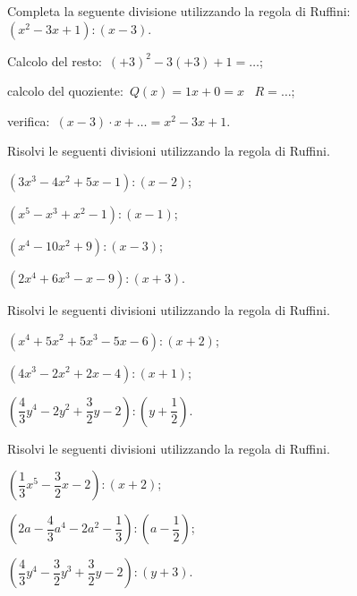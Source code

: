 \begin{esercizio}
\label{ese:11.31}
Completa la seguente divisione utilizzando la regola di Ruffini:\:$\left(x^{2}-3x+1\right):(x-3)$.
\begin{itemize*}
\item Calcolo del resto:~$(+3)^{2}-3(+3)+1=\ldots$;
\item calcolo del quoziente:~$Q(x)=1x+0=x$ \quad~$R=\ldots$;
\item verifica:~$(x-3)\cdot x+\ldots =x^{2}-3x+1$.
\end{itemize*}
\end{esercizio}

\begin{esercizio}[\Ast]
\label{ese:11.32}
Risolvi le seguenti divisioni utilizzando la regola di Ruffini.
\begin{multicols}{2}
 \begin{enumeratea}
 \item $\left(3x^{3}-4x^{2}+5x-1\right):(x-2)$;
 \item $\left(x^{5}-x^{3}+x^{2}-1\right):(x-1)$;
 \item $\left(x^{4}-10x^{2}+9\right):(x-3)$;
 \item $\left(2x^{4}+6x^{3}-x-9\right):(x+3)$.
 \end{enumeratea}
\end{multicols}
\end{esercizio}

\begin{esercizio}[\Ast]
\label{ese:11.33}
Risolvi le seguenti divisioni utilizzando la regola di Ruffini.
\begin{multicols}{2}
 \begin{enumeratea}
 \item $\left(x^{4}+5x^{2}+5x^{3}-5x-6 \right):(x+2)$;%
 \item $\left(4x^{3}-2x^{2}+2x-4 \right):(x+1)$;%
 \item $\left(\dfrac{4}{3}y^{4}-2y^{2}+\dfrac{3}{2}y-2\right):\left(y+\dfrac{1}{2}\right)$.%
 \end{enumeratea}
\end{multicols}
\end{esercizio}

\begin{esercizio}[\Ast]
\label{ese:11.34}
Risolvi le seguenti divisioni utilizzando la regola di Ruffini.
 \begin{enumeratea}
 \item $\left(\dfrac{1}{3}x^{5}-\dfrac{3}{2}x-2\right):(x+2)$;
 \item $\left(2a-\dfrac{4}{3}a^{4}-2a^{2}-\dfrac{1}{3}\right):\left(a-\dfrac{1}{2}\right)$;
 \item $\left(\dfrac{4}{3}y^{4}-\dfrac{3}{2}y^{3}+\dfrac{3}{2}y-2\right):\left(y+3\right)$.
 \end{enumeratea}
\end{esercizio}

